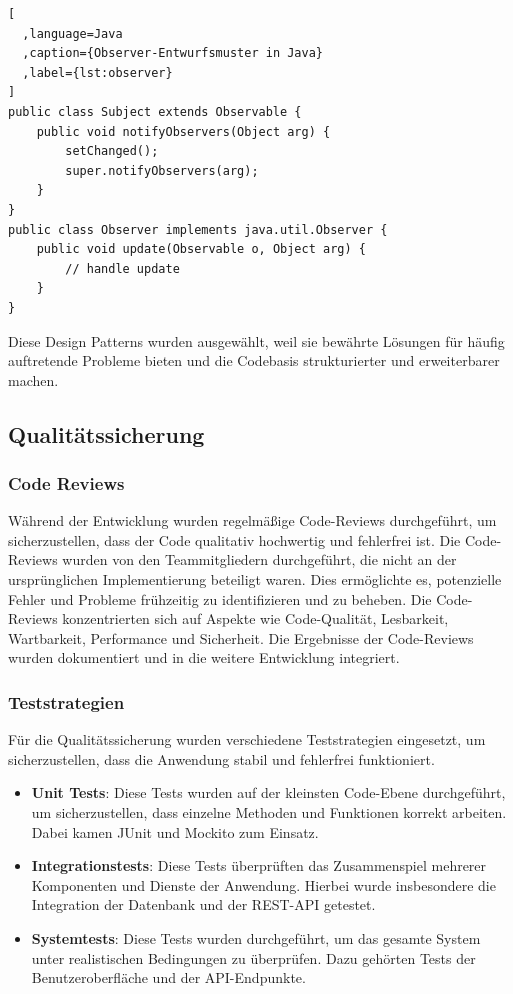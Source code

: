\begin{lstlisting}[
  ,language=Java
  ,caption={Observer-Entwurfsmuster in Java}
  ,label={lst:observer}
]
public class Subject extends Observable {
    public void notifyObservers(Object arg) {
        setChanged();
        super.notifyObservers(arg);
    }
}
public class Observer implements java.util.Observer {
    public void update(Observable o, Object arg) {
        // handle update
    }
}
\end{lstlisting}

Diese Design Patterns wurden ausgewählt, weil sie bewährte Lösungen für häufig auftretende Probleme bieten und die Codebasis strukturierter und erweiterbarer machen.

\subsection{Qualitätssicherung}\label{qualitaetssicherung}

\subsubsection{Code Reviews}\label{code-reviews}

Während der Entwicklung wurden regelmäßige Code-Reviews durchgeführt, um sicherzustellen, dass der Code qualitativ hochwertig und fehlerfrei ist. Die Code-Reviews wurden von den Teammitgliedern durchgeführt, die nicht an der ursprünglichen Implementierung beteiligt waren. Dies ermöglichte es, potenzielle Fehler und Probleme frühzeitig zu identifizieren und zu beheben. Die Code-Reviews konzentrierten sich auf Aspekte wie Code-Qualität, Lesbarkeit, Wartbarkeit, Performance und Sicherheit. Die Ergebnisse der Code-Reviews wurden dokumentiert und in die weitere Entwicklung integriert.

\subsubsection{Teststrategien}\label{teststrategien}

Für die Qualitätssicherung wurden verschiedene Teststrategien eingesetzt, um sicherzustellen, dass die Anwendung stabil und fehlerfrei funktioniert.

\begin{itemize}
  \item
        \textbf{Unit Tests}: Diese Tests wurden auf der kleinsten Code-Ebene durchgeführt, um sicherzustellen, dass einzelne Methoden und Funktionen korrekt arbeiten. Dabei kamen JUnit und Mockito zum Einsatz.
  \item
        \textbf{Integrationstests}: Diese Tests überprüften das Zusammenspiel mehrerer Komponenten und Dienste der Anwendung. Hierbei wurde insbesondere die Integration der Datenbank und der REST-API getestet.
  \item
        \textbf{Systemtests}: Diese Tests wurden durchgeführt, um das gesamte System unter realistischen Bedingungen zu überprüfen. Dazu gehörten Tests der Benutzeroberfläche und der API-Endpunkte.
\end{itemize}

